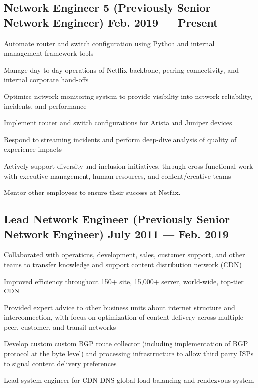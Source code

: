 \documentclass[letter,10pt]{article}
\begin{document}
\subsection{Network Engineer 5 (Previously Senior Network Engineer) \hfill \textrm{\textmd{Feb. 2019 --- Present}}}
\begin{zitemize}
	\item Automate router and switch configuration using Python and
	internal management framework tools
	\item Manage day-to-day operations of Netflix backbone, peering
	connectivity, and internal corporate hand-offs
	\item Optimize network monitoring system to provide visibility
	into network reliability, incidents, and performance
	\item Implement router and switch configurations for Arista and
	Juniper devices
	\item Respond to streaming incidents and perform deep-dive
	analysis of quality of experience impacts
	\item Actively support diversity and inclusion initiatives,
	through cross-functional work with executive management,
	human resources, and content/creative teams
	\item Mentor other employees to ensure their success at Netflix.
\end{zitemize}


\subsection{Lead Network Engineer (Previously Senior Network Engineer) \hfill \textrm{\textmd{July 2011 --- Feb. 2019}}}
\begin{zitemize}
	\item Collaborated with operations, development, sales, customer support,
	and other teams to transfer knowledge and support content
	distribution network (CDN)
	\item Improved efficiency throughout 150+ site, 15,000+ server,
	world-wide, top-tier CDN
	\item Provided expert advice to other business units about internet
	structure and interconnection, with focus on optimization of content delivery across
	multiple peer, customer, and transit networks
	\item Develop custom custom BGP route collector (including
	implementation of BGP protocol at the byte level) and processing infrastructure
	to allow third party ISPs to signal content delivery preferences
	\item Lead system engineer for CDN DNS global load balancing and
	rendezvous system
\end{zitemize}
\end{document}
